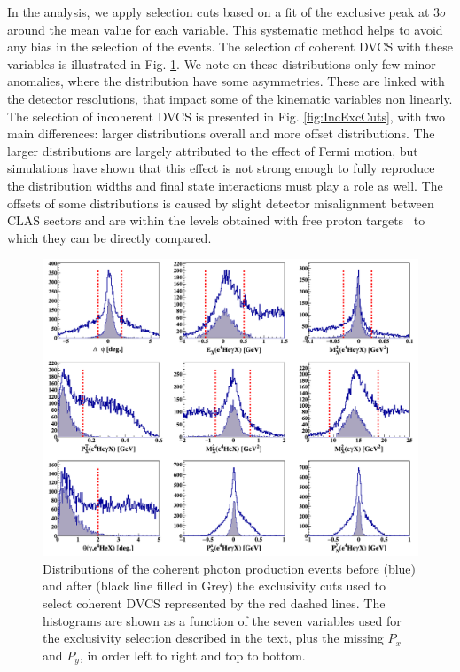 \documentclass[aps,prc,preprint,superscriptaddress]{revtex4}
\begin{document}
In the analysis, we apply selection cuts based on a fit of the exclusive peak at 3$\sigma$ around 
the mean value for each variable. This systematic method helps to avoid any bias 
in the selection of the events. The selection of coherent DVCS with these variables is illustrated in 
Fig. \ref{fig:CohExcCuts}. We note on these distributions only few minor anomalies, where the 
distribution have some asymmetries. These are linked with the detector resolutions, that impact
some of the kinematic variables non linearly. The selection of incoherent DVCS is presented in 
Fig. \ref{fig:IncExcCuts}, with two main differences: larger distributions overall and more
offset distributions. The larger distributions are largely attributed to the effect of 
Fermi motion, but simulations have shown that this effect is not strong enough to fully 
reproduce the distribution widths and final state interactions must play a role as well. 
The offsets of some distributions is caused by slight detector 
misalignment between CLAS sectors and are within the levels obtained with free proton 
targets~\cite{HirlingerSaylor:2018bnu} to which they can be directly compared. 

\begin{figure}[tbp!]
\center
\includegraphics[trim=10 10 10 5,clip,width=16.5cm]{fig3/all_coh_exc_cuts.png}
        \caption{Distributions of the coherent photon production events before 
        (blue) and after (black line filled
	in Grey) the exclusivity cuts used to select coherent DVCS represented by the 
	red dashed lines. The histograms are shown as a function of the 
	seven variables used for the exclusivity selection described in the text, 
	plus the missing $P_x$ and $P_y$, in order left to right and top to bottom. 
	}
\label{fig:CohExcCuts}
\end{figure}
\end{document}
